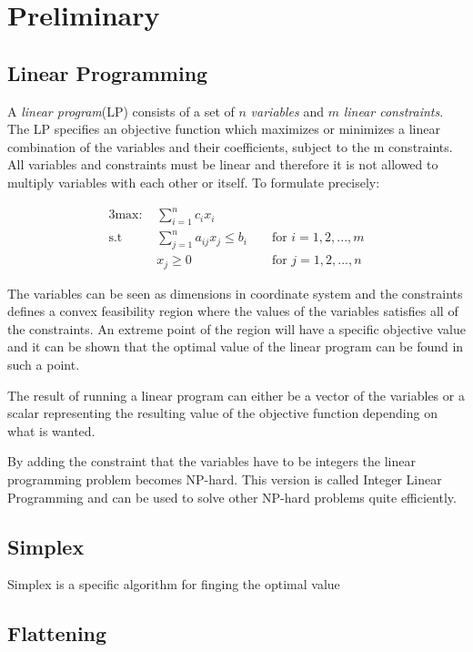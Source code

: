 \section{Preliminary}
\subsection{Linear Programming}
A \textit{linear program}(LP) consists of a set of $n$ \textit{variables} and $m$ \textit{linear constraints}. The LP specifies an objective function which maximizes or minimizes a linear combination of the variables and their coefficients, subject to the m constraints. All variables and constraints must be linear and therefore it is not allowed to multiply variables with each other or itself. To formulate precisely:

\begin{alignat}{3}
\text{max: } &\sum_{i=1}^{n} c_i x_i\nonumber\\ 
\text{s.t }  & \sum_{j=1}^{n} a_{ij} x_j \leq b_i && \text{ for } i=1,2,...,m\nonumber\\ 
& x_j \geq 0                         && \text{ for } j=1,2,...,n\nonumber
\end{alignat}

The variables can be seen as dimensions in coordinate system and the constraints defines a convex feasibility region where the values of the variables satisfies all of the constraints. An extreme point of the region will have a specific objective value and it can be shown that the optimal value of the linear program can be found in such a point. 

The result of running a linear program can either be a vector of the variables or a scalar representing the resulting value of the objective function depending on what is wanted. 

By adding the constraint that the variables have to be integers the linear programming problem becomes NP-hard. This version is called Integer Linear Programming and can be used to solve other NP-hard problems quite efficiently.

\subsection{Simplex}
Simplex is a specific algorithm for finging the optimal value

\subsection{Flattening}
